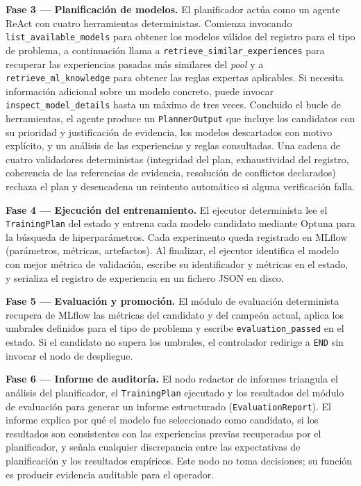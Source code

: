 \textbf{Fase 3 --- Planificación de modelos.} El planificador actúa como un agente ReAct con cuatro herramientas deterministas. Comienza invocando \texttt{list\_available\_models} para obtener los modelos válidos del registro para el tipo de problema, a continuación llama a \texttt{retrieve\_similar\_experiences} para recuperar las experiencias pasadas más similares del \emph{pool} y a \texttt{retrieve\_ml\_knowledge} para obtener las reglas expertas aplicables. Si necesita información adicional sobre un modelo concreto, puede invocar \texttt{inspect\_model\_details} hasta un máximo de tres veces. Concluido el bucle de herramientas, el agente produce un \texttt{PlannerOutput} que incluye los candidatos con su prioridad y justificación de evidencia, los modelos descartados con motivo explícito, y un análisis de las experiencias y reglas consultadas. Una cadena de cuatro validadores deterministas (integridad del plan, exhaustividad del registro, coherencia de las referencias de evidencia, resolución de conflictos declarados) rechaza el plan y desencadena un reintento automático si alguna verificación falla.

\textbf{Fase 4 --- Ejecución del entrenamiento.} El ejecutor determinista lee el \texttt{TrainingPlan} del estado y entrena cada modelo candidato mediante Optuna para la búsqueda de hiperparámetros. Cada experimento queda registrado en MLflow (parámetros, métricas, artefactos). Al finalizar, el ejecutor identifica el modelo con mejor métrica de validación, escribe su identificador y métricas en el estado, y serializa el registro de experiencia en un fichero JSON en disco.

\textbf{Fase 5 --- Evaluación y promoción.} El módulo de evaluación determinista recupera de MLflow las métricas del candidato y del campeón actual, aplica los umbrales definidos para el tipo de problema y escribe \texttt{evaluation\_passed} en el estado. Si el candidato no supera los umbrales, el controlador redirige a \texttt{END} sin invocar el nodo de despliegue.

\textbf{Fase 6 --- Informe de auditoría.} El nodo redactor de informes triangula el análisis del planificador, el \texttt{TrainingPlan} ejecutado y los resultados del módulo de evaluación para generar un informe estructurado (\texttt{EvaluationReport}). El informe explica por qué el modelo fue seleccionado como candidato, si los resultados son consistentes con las experiencias previas recuperadas por el planificador, y señala cualquier discrepancia entre las expectativas de planificación y los resultados empíricos. Este nodo no toma decisiones; su función es producir evidencia auditable para el operador.


